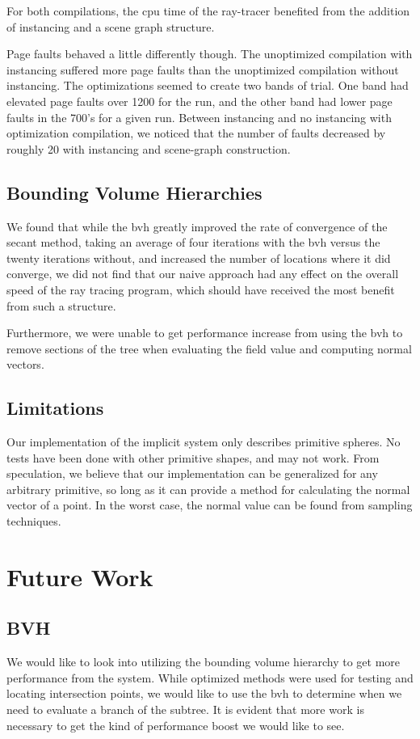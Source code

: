 \documentclass[conference]{acmsiggraph}
\begin{document}
For both compilations, the cpu time of the ray-tracer benefited from the
addition of instancing and a scene graph structure.

Page faults behaved a little differently though. The unoptimized compilation
with instancing suffered more page faults than the unoptimized compilation
without instancing. The optimizations seemed to create two bands of trial. One
band had elevated page faults over 1200 for the run, and the other band had
lower page faults in the 700's for a given run. Between instancing and no
instancing with optimization compilation, we noticed that the number of faults
decreased by roughly 20 with instancing and scene-graph construction.

\subsection{Bounding Volume Hierarchies}
We found that while the bvh greatly improved the rate of convergence of the
secant method, taking an average of four iterations with the bvh versus the
twenty iterations without, and increased the number of locations where it did
converge, we did not find that our naive approach had any effect on the overall
speed of the ray tracing program, which should have received the most benefit
from such a structure.

Furthermore, we were unable to get performance increase from using the bvh to
remove sections of the tree when evaluating the field value and computing
normal vectors.

\subsection{Limitations}
Our implementation of the implicit system only describes primitive spheres. No
tests have been done with other primitive shapes, and may not work. From
speculation, we believe that our implementation can be generalized for any
arbitrary primitive, so long as it can provide a method for calculating the
normal vector of a point. In the worst case, the normal value can be found
from sampling techniques\cite{Stam2011}.

\section{Future Work}
\subsection{BVH}
We would like to look into utilizing the bounding volume hierarchy to get more
performance from the system. While optimized methods were used for testing and
locating intersection points, we would like to use the bvh to determine when we
need to evaluate a branch of the subtree. It is evident that more work is
necessary to get the kind of performance boost we would like to see.
\end{document}

